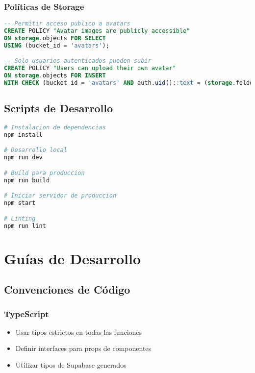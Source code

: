 \documentclass[12pt,a4paper]{article}
\begin{document}
\subsubsection{Políticas de Storage}
\begin{lstlisting}[language=sql, caption=Políticas de storage para avatars]
-- Permitir acceso publico a avatars
CREATE POLICY "Avatar images are publicly accessible" 
ON storage.objects FOR SELECT 
USING (bucket_id = 'avatars');

-- Solo usuarios autenticados pueden subir
CREATE POLICY "Users can upload their own avatar" 
ON storage.objects FOR INSERT 
WITH CHECK (bucket_id = 'avatars' AND auth.uid()::text = (storage.foldername(name))[1]);
\end{lstlisting}

\subsection{Scripts de Desarrollo}

\begin{lstlisting}[language=bash, caption=Comandos de desarrollo]
# Instalacion de dependencias
npm install

# Desarrollo local
npm run dev

# Build para produccion
npm run build

# Iniciar servidor de produccion
npm start

# Linting
npm run lint
\end{lstlisting}

\section{Guías de Desarrollo}

\subsection{Convenciones de Código}

\subsubsection{TypeScript}
\begin{itemize}
    \item Usar tipos estrictos en todas las funciones
    \item Definir interfaces para props de componentes
    \item Utilizar tipos de Supabase generados
\end{itemize}
\end{document}
